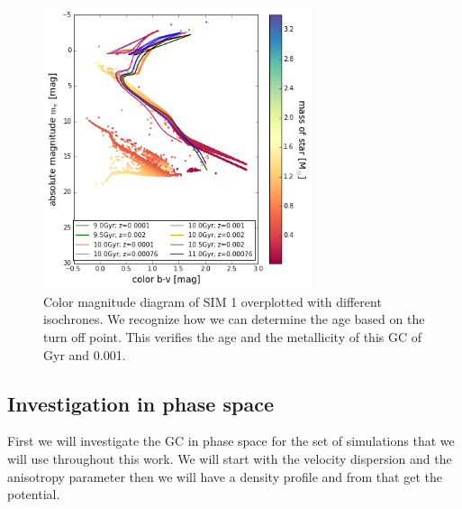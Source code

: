 \begin{figure}[htbp]
\centering
\includegraphics[width=0.7\textwidth]{Plots/cmd_isochrones.png}
\caption{Color magnitude diagram of SIM 1 overplotted with different isochrones. We recognize how we can determine the age based on the turn off point. This verifies the age and the metallicity of this \ac{GC} of \unit[10]{Gyr} and 0.001.}
	\label{fig:cmd_isochrones}
\end{figure}



\subsection{Investigation in phase space}\label{sec:phase_space}

First we will investigate the \ac{GC} in phase space for the set of simulations that we will use throughout this work. We will start with the velocity dispersion and the anisotropy parameter then we will have a density profile and from that get the potential. 

